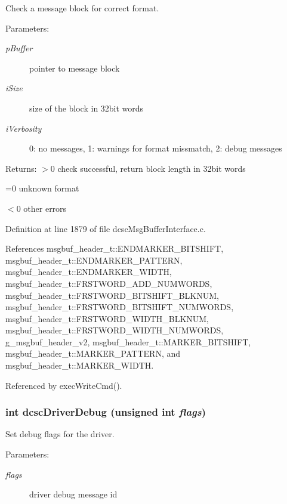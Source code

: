 Check a message block for correct format. 

\begin{Desc}
\item[Parameters:]
\begin{description}
\item[{\em p\-Buffer}]pointer to message block \item[{\em i\-Size}]size of the block in 32bit words \item[{\em i\-Verbosity}]0: no messages, 1: warnings for format missmatch, 2: debug messages \end{description}
\end{Desc}
\begin{Desc}
\item[Returns:]$>$0 check successful, return block length in 32bit words\par
 =0 unknown format\par
 $<$0 other errors \end{Desc}


Definition at line 1879 of file dcsc\-Msg\-Buffer\-Interface.c.

References msgbuf\_\-header\_\-t::ENDMARKER\_\-BITSHIFT, msgbuf\_\-header\_\-t::ENDMARKER\_\-PATTERN, msgbuf\_\-header\_\-t::ENDMARKER\_\-WIDTH, msgbuf\_\-header\_\-t::FRSTWORD\_\-ADD\_\-NUMWORDS, msgbuf\_\-header\_\-t::FRSTWORD\_\-BITSHIFT\_\-BLKNUM, msgbuf\_\-header\_\-t::FRSTWORD\_\-BITSHIFT\_\-NUMWORDS, msgbuf\_\-header\_\-t::FRSTWORD\_\-WIDTH\_\-BLKNUM, msgbuf\_\-header\_\-t::FRSTWORD\_\-WIDTH\_\-NUMWORDS, g\_\-msgbuf\_\-header\_\-v2, msgbuf\_\-header\_\-t::MARKER\_\-BITSHIFT, msgbuf\_\-header\_\-t::MARKER\_\-PATTERN, and msgbuf\_\-header\_\-t::MARKER\_\-WIDTH.

Referenced by exec\-Write\-Cmd().\hypertarget{group__dcsc__msg__buffer__access_g8dc96e96fb45e86a27c98fbe8d816edf}{
\subsubsection[dcscDriverDebug]{\setlength{\rightskip}{0pt plus 5cm}int dcsc\-Driver\-Debug (unsigned int {\em flags})}}
\label{group__dcsc__msg__buffer__access_g8dc96e96fb45e86a27c98fbe8d816edf}


Set debug flags for the driver. 

\begin{Desc}
\item[Parameters:]
\begin{description}
\item[{\em flags}]driver debug message id \end{description}
\end{Desc}


